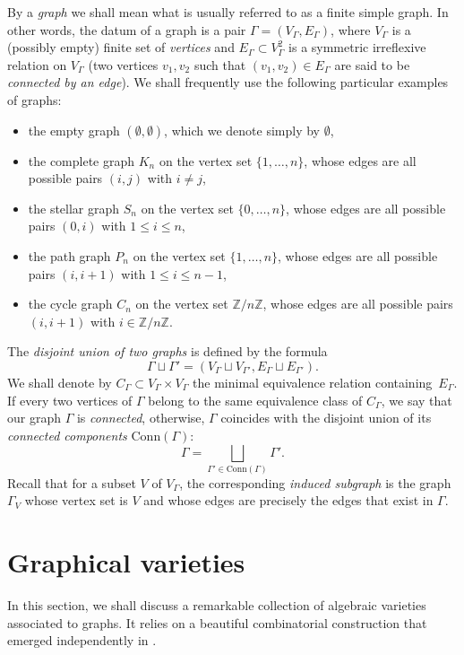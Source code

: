 \documentclass[11pt]{article}
\theoremstyle{definition}
\numberwithin{equation}{section}
\begin{document}
By a \emph{graph} we shall mean what is usually referred to as a finite simple graph. In other words, the datum of a graph is a pair $\Gamma=(V_\Gamma,E_\Gamma)$, where $V_\Gamma$ is a (possibly empty) finite set of \emph{vertices} and $E_\Gamma\subset V_\Gamma^2$ is a symmetric irreflexive relation on $V_\Gamma$ (two vertices $v_1,v_2$ such that $(v_1,v_2)\in E_\Gamma$ are said to be \emph{connected by an edge}). We shall frequently use the following particular examples of graphs:
\begin{itemize}
\item the empty graph $(\emptyset,\emptyset)$, which we denote simply by $\emptyset$,
\item the complete graph $K_n$ on the vertex set $\{1,\ldots,n\}$, whose edges are all possible pairs $(i,j)$ with $i\ne j$,
\item the stellar graph $S_n$ on the vertex set $\{0,\ldots,n\}$, whose edges are all possible pairs $(0,i)$ with $1\le i\le n$,
\item the path graph $P_n$ on the vertex set $\{1,\ldots,n\}$, whose edges are all possible pairs $(i,i+1)$ with $1\le i\le n-1$, 
\item the cycle graph $C_n$ on the vertex set $\mathbb{Z}/n\mathbb{Z}$, whose edges are all possible pairs $(i,i+1)$ with $i\in\mathbb{Z}/n\mathbb{Z}$. 
\end{itemize}

The \emph{disjoint union of two graphs} is defined by the formula 
 \[
\Gamma\sqcup \Gamma' = (V_\Gamma\sqcup V_{\Gamma'}, E_\Gamma\sqcup E_{\Gamma'}). 
 \]
We shall denote by $C_\Gamma\subset V_\Gamma\times V_\Gamma$ the minimal equivalence relation containing~$E_\Gamma$. If every two vertices of $\Gamma$ belong to the same equivalence class of $C_\Gamma$, we say that our graph $\Gamma$ is \emph{connected}, otherwise, $\Gamma$ coincides with the disjoint union of its \emph{connected components} $\mathrm{Conn}(\Gamma)$:
 \[
\Gamma=\bigsqcup_{\Gamma'\in\mathrm{Conn}(\Gamma)}\Gamma'. 
 \]
Recall that for a subset $V$ of $V_\Gamma$, the corresponding \emph{induced subgraph} is the graph $\Gamma_V$ whose vertex set is $V$ and whose edges are precisely the edges that exist in $\Gamma$. 

\section{Graphical varieties}\label{sec:graphical-vars}

In this section, we shall discuss a remarkable collection of algebraic varieties associated to graphs. It relies on a beautiful combinatorial construction that emerged independently in \cite{MR2239078,MR2487491,MR2470574,MR2252112}. 
\end{document}
